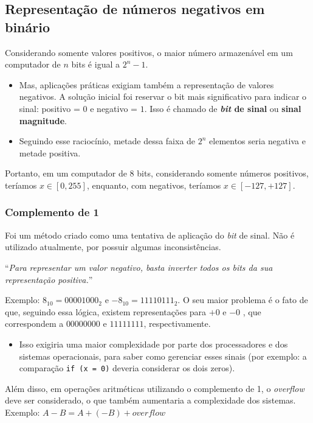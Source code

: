 \documentclass[12pt]{article}
\begin{document}
\subsection{Representação de números negativos em binário}
Considerando somente valores positivos, o maior número armazenável em um computador de $n$ bits é igual a $2^n - 1$.
\begin{itemize}
    \item [""] Mas, aplicações práticas exigiam também a representação de valores negativos. A solução inicial foi reservar o bit mais significativo para indicar o sinal: positivo = $0$ e negativo = $1$. Isso é chamado de \textbf{\textit{bit} de sinal} ou \textbf{sinal magnitude}.
    \item [""] Seguindo esse raciocínio, metade dessa faixa de $2^n$ elementos seria negativa e metade positiva.
\end{itemize}
Portanto, em um computador de 8 bits, considerando somente números positivos, teríamos $x \in [0, 255]$, enquanto, com negativos, teríamos $x \in [-127, +127]$.

\subsubsection{Complemento de 1}
Foi um método criado como uma tentativa de aplicação do \textit{bit} de sinal. Não é utilizado atualmente, por possuir algumas inconsistências.

\vspace{0.2cm}
\noindent
“\textit{Para representar um valor negativo, basta inverter todos os bits da sua representação positiva.}”
\vspace{0.2cm}

\noindent
Exemplo: $8_{10} = 00001000_{2}$ e $-8_{10} = 11110111_{2}$.
O seu maior problema é o fato de que, seguindo essa lógica, existem representações para $+0$ e $-0$ , que correspondem a $00000000$ e $11111111$, respectivamente.

\begin{itemize}
    \item [""] Isso exigiria uma maior complexidade por parte dos processadores e dos sistemas operacionais, para saber como gerenciar esses sinais (por exemplo: a comparação \verb|if (x = 0)| deveria considerar os dois zeros).
\end{itemize}

\noindent
Além disso, em operações aritméticas utilizando o complemento de 1, o \textit{overflow} deve ser considerado, o que também aumentaria a complexidade dos sistemas. \\
Exemplo: $A - B = A + (-B) + overflow$
\end{document}
